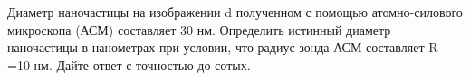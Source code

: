 
Диаметр наночастицы на изображении d полученном с помощью атомно-силового микроскопа (АСМ) составляет 30 нм. Определить истинный диаметр наночастицы в нанометрах при условии, что радиус зонда АСМ составляет R =10 нм. Дайте ответ с точностью до сотых.


